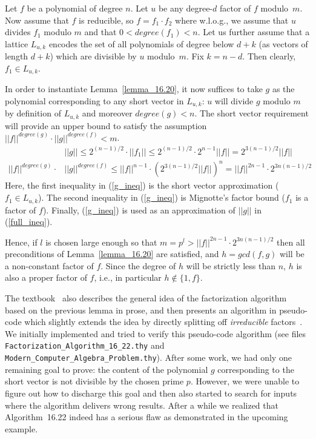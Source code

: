 \documentclass[11pt,a4paper]{article}
\newcommand\norm[1]{|\!|#1|\!|}
\newcommand\degree[1]{\mathit{degree}(#1)}
\renewcommand\gcd{\mathit{gcd}}
\newcommand\rsub[1]{(\ref{#1})}
\newcommand\rLE[1]{Lemma~\ref{#1}}
\begin{document}
Let $f$ be a polynomial of degree $n$. Let $u$ be any degree-$d$ factor of $f$ modulo~$m$.
Now assume that $f$ is reducible, so $f = f_1 \cdot f_2$ where 
w.l.o.g., we assume that $u$ divides $f_1$ modulo $m$ and that $0 < \degree{f_1} < n$.
Let us further assume that
 a lattice $L_{u,k}$ encodes
the set of all polynomials of degree below $d+k$ (as vectors of length $d+k$) which are divisible by $u$ modulo~$m$.
Fix $k = n - d$. Then clearly, $f_1 \in L_{u,k}$.

In order to instantiate \rLE{lemma_16.20}, it now suffices to take $g$ as the polynomial corresponding
to any short vector in $L_{u,k}$: $u$ will divide $g$ modulo $m$ by definition of $L_{u,k}$
and moreover $\degree g < n$. 
The short vector requirement will provide an upper bound to satisfy
the assumption $\norm f^{\degree g} \cdot \norm g^{\degree f} < m$.
\begin{align}
\label{g_ineq} & \norm g  \leq 2^{(n - 1)/2} \cdot \norm{f_1} \leq 2^{(n - 1)/2} \cdot 2^{n-1} \norm f 
  = 2^{3(n-1)/2} \norm f \\
\label{full_ineq} \norm f^{\degree g} \cdot & \norm g^{\degree f}
\leq 
\norm f^{n-1} \cdot (2^{3(n - 1)/2} \norm f)^{n} = \norm f^{2n-1} \cdot 2^{3n(n - 1)/2}
\end{align}
Here, the first inequality in \rsub{g_ineq} is the short vector approximation ($f_1 \in L_{u,k}$).
The second inequality in \rsub{g_ineq} is Mignotte's factor bound ($f_1$ is a factor of $f$). 
Finally, \rsub{g_ineq} is used as an approximation of $\norm g$ in \rsub{full_ineq}.

Hence, if $l$ is chosen large enough so that $m = p^l > \norm f^{2n-1} \cdot 2^{3n(n - 1)/2}$ then all
preconditions of \rLE{lemma_16.20} are satisfied, and $h = \gcd(f,g)$ will be a non-constant 
factor of $f$. Since the degree of $h$ will be strictly less than $n$, $h$ is also a proper factor
of $f$, i.e., in particular $h \notin \{1,f\}$.

The textbook~\cite{MCA} also describes the general idea of the factorization algorithm based on 
the previous lemma in prose, 
and then presents an algorithm in pseudo-code which slightly extends the idea by
directly splitting off \emph{irreducible} factors~\cite[Algorithm~16.22]{MCA}. 
We initially implemented and tried to verify this pseudo-code algorithm (see files \texttt{Factorization\_Algorithm\_16\_22.thy} 
and \texttt{Modern\_Computer\_Algebra\_Problem.thy}). After some work, 
we had only one remaining goal to prove: the content of the polynomial $g$ corresponding to the short vector is not
divisible by the chosen prime $p$.
However,
we were unable to figure out how to discharge this goal and then also started to search for inputs
where the algorithm delivers wrong results. After a while we realized that Algorithm~16.22 indeed
has a serious flaw as demonstrated in the upcoming example.
\end{document}
